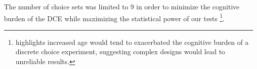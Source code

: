 \documentclass[3p,11pt ]{elsarticle}
\begin{document}
The number of choice sets was limited to 9 in order to minimize the cognitive burden of the DCE while maximizing the statistical power of our tests \citep{manghamHowNotDesigning2009,deshazoDesigningChoiceSets2002}
\footnote{\cite{himmlerWhatWorksBetter2021} highlights increased age would tend to exacerbated the cognitive burden of a discrete choice experiment, suggesting complex designs would lead to unreliable results.}.









%
%
%


%
%
%
%
%
\end{document}
